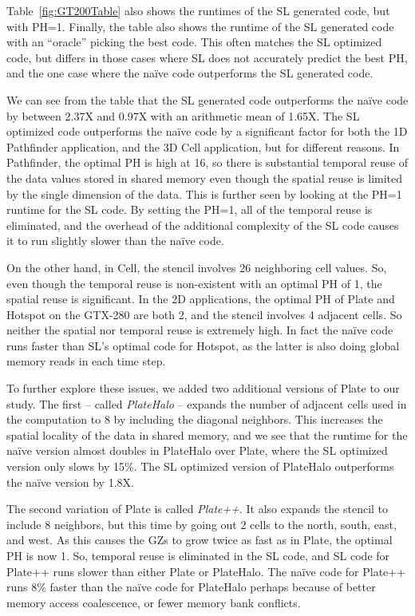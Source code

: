\documentclass[preprint,nocopyrightspace]{styles/sigplanconf}
\begin{document}
Table~\ref{fig:GT200Table} also shows the runtimes of
the SL generated code, but with PH=1.  Finally,
the table also shows the runtime of the SL generated code with
an ``oracle'' picking the best code.  This often matches the SL
optimized code, but differs in those cases where
SL does not accurately predict the best PH, and the one
case where the na\"{i}ve code outperforms the SL 
generated code.

We can see from the table that the SL generated code outperforms the na\"{i}ve
code by between 2.37X and 0.97X with an arithmetic mean of 1.65X.
The SL optimized code outperforms the na\"{i}ve code by a significant factor
for both the 1D Pathfinder application, and the 3D Cell application, but for
different reasons.  In Pathfinder, the optimal PH is high at 16, so there is
substantial temporal reuse of the data values stored in shared memory even
though the spatial reuse is limited by the single dimension of the data.  This
is further seen by looking at the PH=1 runtime for the SL code.  By setting the
PH=1, all of the temporal reuse is eliminated, and the overhead of the
additional complexity of the SL code causes it to run slightly slower than the
na\"{i}ve code.

On the other hand, in Cell, the stencil involves 26 neighboring cell values.
So, even though the temporal reuse is non-existent with an optimal PH of 1, 
the spatial reuse is significant.
In the 2D applications, the optimal PH of Plate and Hotspot
on the GTX-280 are both 2, and the stencil involves 4 adjacent cells.  
So neither the spatial nor temporal reuse is extremely high.
In fact the na\"{i}ve code runs faster than SL's optimal
code for Hotspot, as the latter is also doing global memory reads
in each time step.

To further explore these issues, we added two additional versions of Plate
to our study.  The first -- called {\em PlateHalo} -- expands the number of
adjacent cells used in the computation to 8 by including the diagonal
neighbors.  This increases the spatial locality of the data in shared
memory, and we see that the runtime for the na\"{i}ve version almost doubles
in PlateHalo over Plate, where the SL optimized version only slows by 15\%.  
The SL optimized version of PlateHalo outperforms the na\"{i}ve version by 1.8X.

The second variation of Plate is called {\em Plate++}.  It also
expands the stencil to include 8 neighbors, but this time by going out 2 cells
to the north, south, east, and west.  As this causes the GZs to grow twice as
fast as in Plate, the optimal PH is now 1.  So, temporal reuse is eliminated in
the SL code, and SL code for Plate++ runs slower than either Plate or
PlateHalo.  The na\"{i}ve code for Plate++ runs 8\% faster than the na\"{i}ve
code for PlateHalo perhaps because of better memory access coalescence, or fewer
memory bank conflicts.
\end{document}
